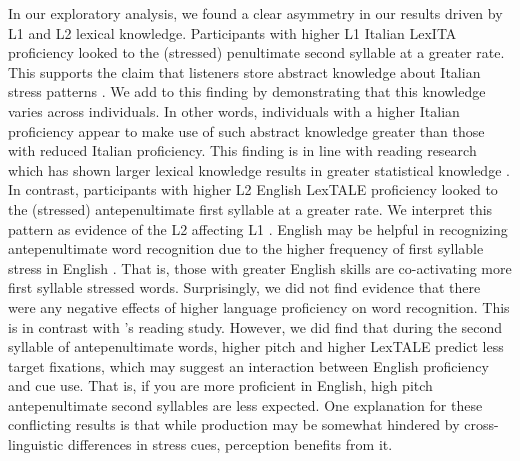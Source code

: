 In our exploratory analysis, we found a clear asymmetry in our results driven by L1 and L2 lexical knowledge. Participants with higher L1 Italian LexITA proficiency looked to the (stressed) penultimate second syllable at a greater rate. This supports the claim that listeners store abstract knowledge about Italian stress patterns \citep{Sulpizio_McQueen_2012}. We add to this finding by demonstrating that this knowledge varies across individuals. In other words, individuals with a higher Italian proficiency appear to make use of such abstract knowledge greater than those with reduced Italian proficiency. This finding is in line with reading research which has shown larger lexical knowledge results in greater statistical knowledge \citep{mirman2008attractor, kuperman2013reassessing}. In contrast, participants with higher L2 English LexTALE proficiency looked to the (stressed) antepenultimate first syllable at a greater rate. We interpret this pattern as evidence of the L2 affecting L1 \citep{marian2003competing, dijkstra2002architecture}. English may be helpful in recognizing antepenultimate word recognition due to the higher frequency of first syllable stress in English \cite{cutler2007dutch}. That is, those with greater English skills are co-activating more first syllable stressed words. Surprisingly, we did not find evidence that there were any negative effects of higher language proficiency on word recognition. This is in contrast with \cite{primativo2013bilingual}'s reading study. However, we did find that during the second syllable of antepenultimate words, higher pitch and higher LexTALE predict less target fixations, which may suggest an interaction between English proficiency and cue use. That is, if you are more proficient in English, high pitch antepenultimate second syllables are less expected. One explanation for these conflicting results is that while production may be somewhat hindered by cross-linguistic differences in stress cues, perception benefits from it.

